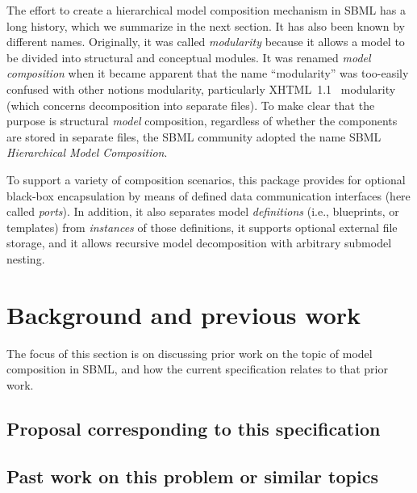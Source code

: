 The effort to create a hierarchical model composition mechanism in SBML
has a long history, which we summarize in the next section.  It has also
been known by different names.  Originally, it was called
\emph{modularity} because it allows a model to be divided into
structural and conceptual modules. It was renamed \emph{model
  composition} when it became apparent that the name ``modularity'' was
too-easily confused with other notions modularity, particularly
XHTML~1.1~\cite{} modularity (which concerns decomposition into separate
files).  To make clear that the purpose is structural \emph{model}
composition, regardless of whether the components are stored in separate
files, the SBML community adopted the name SBML \emph{Hierarchical Model
  Composition}.

To support a variety of composition scenarios, this package provides for
optional black-box encapsulation by means of defined data communication
interfaces (here called \emph{ports}).  In addition, it also separates
model \emph{definitions} (i.e., blueprints, or templates) from
\emph{instances} of those definitions, it supports optional external
file storage, and it allows recursive model decomposition with arbitrary
submodel nesting.


\section{Background and previous work}
\label{sec:background}

The focus of this section is on discussing prior work on the topic of
model composition in SBML, and how the current specification relates to
that prior work.


\subsection{Proposal corresponding to this specification}


\subsection{Past work on this problem or similar topics}

